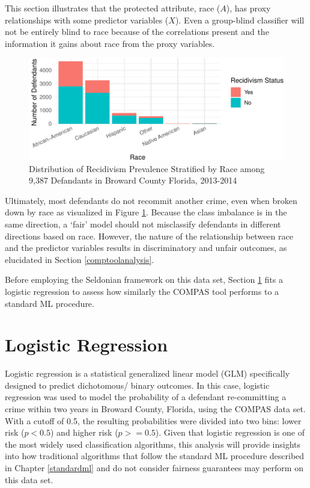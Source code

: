 \documentclass[12pt, twoside]{amherstthesis}
\begin{document}
This section illustrates that the protected attribute, race (\(A\)), has proxy relationships with some predictor variables (\(X\)). Even a group-blind classifier will not be entirely blind to race because of the correlations present and the information it gains about race from the proxy variables.
\begin{figure}

{\centering \includegraphics{Dasha-Asienga_StatThesis_files/figure-latex/ch3fig13-1} 

}

\caption{Distribution of Recidivism Prevalence Stratified by Race among 9,387 Defandants in Broward County Florida, 2013-2014}\label{fig:ch3fig13}
\end{figure}
Ultimately, most defendants do not recommit another crime, even when broken down by race as visualized in Figure \ref{fig:ch3fig13}. Because the class imbalance is in the same direction, a `fair' model should not misclassify defendants in different directions based on race. However, the nature of the relationship between race and the predictor variables results in discriminatory and unfair outcomes, as elucidated in Section \ref{comptoolanalysis}.

Before employing the Seldonian framework on this data set, Section \ref{logreg} fits a logistic regression to assess how similarly the COMPAS tool performs to a standard ML procedure.

\hypertarget{logreg}{%
\section{Logistic Regression}\label{logreg}}

Logistic regression is a statistical generalized linear model (GLM) specifically designed to predict dichotomous/ binary outcomes. In this case, logistic regression was used to model the probability of a defendant re-committing a crime within two years in Broward County, Florida, using the COMPAS data set. With a cutoff of 0.5, the resulting probabilities were divided into two bins: lower risk (\(p < 0.5\)) and higher risk (\(p >= 0.5\)). Given that logistic regression is one of the most widely used classification algorithms, this analysis will provide insights into how traditional algorithms that follow the standard ML procedure described in Chapter \ref{standardml} and do not consider fairness guarantees may perform on this data set.
\end{document}
